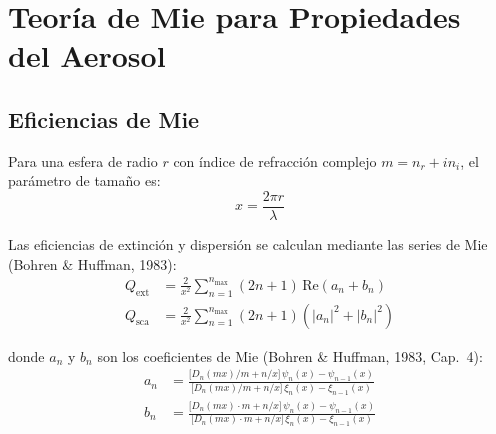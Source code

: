\documentclass[a4paper,11pt]{article}
\begin{document}
\section{Teor\'ia de Mie para Propiedades del Aerosol}\label{sec:mie}

\subsection{Eficiencias de Mie}

Para una esfera de radio $r$ con \'indice de refracci\'on complejo
$m = n_r + in_i$, el par\'ametro de tama\~no es:
\begin{equation}
    x = \frac{2\pi r}{\lambda}
\end{equation}

Las eficiencias de extinci\'on y dispersi\'on se calculan mediante las series
de Mie (Bohren \& Huffman, 1983):
\begin{align}
    Q_{\text{ext}} &= \frac{2}{x^2}\sum_{n=1}^{n_{\max}}(2n+1)\,\text{Re}(a_n + b_n)\\
    Q_{\text{sca}} &= \frac{2}{x^2}\sum_{n=1}^{n_{\max}}(2n+1)(|a_n|^2 + |b_n|^2)
\end{align}

donde $a_n$ y $b_n$ son los coeficientes de Mie (Bohren \& Huffman, 1983,
Cap.~4):
\begin{align}\label{eq:mie_an_bn}
    a_n &= \frac{\bigl[D_n(mx)/m + n/x\bigr]\,\psi_n(x) - \psi_{n-1}(x)}
               {\bigl[D_n(mx)/m + n/x\bigr]\,\xi_n(x)  - \xi_{n-1}(x)}\\[6pt]
    b_n &= \frac{\bigl[D_n(mx)\cdot m + n/x\bigr]\,\psi_n(x) - \psi_{n-1}(x)}
               {\bigl[D_n(mx)\cdot m + n/x\bigr]\,\xi_n(x)  - \xi_{n-1}(x)}
\end{align}
\end{document}
